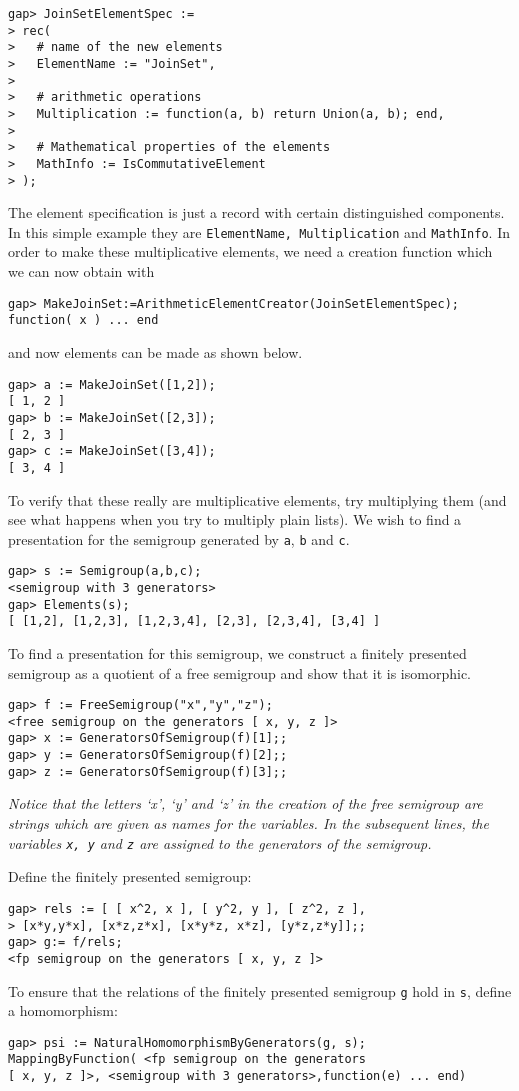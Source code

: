 \documentclass{ws-p8-50x6-00}
\theoremstyle{plain} \newtheorem{Thm}{Theorem}
\theoremstyle{plain} \newtheorem{Cor}{Corollary}
\theoremstyle{plain} \newtheorem{Lemma}{Lemma}
\theoremstyle{plain} \newtheorem{Prop}{Proposition}
\theoremstyle{plain} \newtheorem{Ex}{Exercise}
\begin{document}
\begin{verbatim}
gap> JoinSetElementSpec :=
> rec(
>   # name of the new elements
>   ElementName := "JoinSet",
> 
>   # arithmetic operations
>   Multiplication := function(a, b) return Union(a, b); end,
> 
>   # Mathematical properties of the elements
>   MathInfo := IsCommutativeElement
> );
\end{verbatim}
The element specification is just a record with certain distinguished
components. In this simple example they are
{\tt ElementName, Multiplication} and {\tt MathInfo}.
In order to make these multiplicative elements, we need a 
creation function which we can now obtain with
\begin{verbatim}
gap> MakeJoinSet:=ArithmeticElementCreator(JoinSetElementSpec);
function( x ) ... end
\end{verbatim}
and now elements can be made as shown below.
\begin{verbatim}
gap> a := MakeJoinSet([1,2]);
[ 1, 2 ]
gap> b := MakeJoinSet([2,3]);
[ 2, 3 ]
gap> c := MakeJoinSet([3,4]);
[ 3, 4 ]
\end{verbatim}
To verify that these really are multiplicative elements, 
try multiplying them (and see what happens when you 
try to multiply plain lists).
We wish to find a presentation for the semigroup generated by
{\tt a}, {\tt b} and {\tt c}.
\begin{verbatim}
gap> s := Semigroup(a,b,c);
<semigroup with 3 generators>
gap> Elements(s);
[ [1,2], [1,2,3], [1,2,3,4], [2,3], [2,3,4], [3,4] ]
\end{verbatim}

To find a presentation for this semigroup, we construct a finitely
presented semigroup as a quotient of a free semigroup and
show that it is isomorphic.
\begin{verbatim}
gap> f := FreeSemigroup("x","y","z");
<free semigroup on the generators [ x, y, z ]>
gap> x := GeneratorsOfSemigroup(f)[1];;
gap> y := GeneratorsOfSemigroup(f)[2];;
gap> z := GeneratorsOfSemigroup(f)[3];;
\end{verbatim}
{\em Notice that the letters `x', `y' and `z' in the creation of the 
free semigroup are strings which are given as names for the variables.
In the subsequent lines, the variables {\tt x, y} and {\tt z} are assigned
to the generators of the semigroup.}

Define the finitely presented semigroup:
\begin{verbatim}
gap> rels := [ [ x^2, x ], [ y^2, y ], [ z^2, z ], 
> [x*y,y*x], [x*z,z*x], [x*y*z, x*z], [y*z,z*y]];;
gap> g:= f/rels;                                                               
<fp semigroup on the generators [ x, y, z ]>
\end{verbatim}
To ensure that the relations of the finitely presented semigroup {\tt g}
hold in {\tt s}, define a homomorphism:
\begin{verbatim}
gap> psi := NaturalHomomorphismByGenerators(g, s);                             
MappingByFunction( <fp semigroup on the generators 
[ x, y, z ]>, <semigroup with 3 generators>,function(e) ... end)
\end{verbatim}
\end{document}
